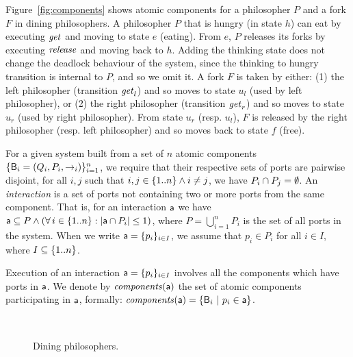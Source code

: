 Figure~\ref{fig:components} shows atomic components for a philosopher $P$
and a fork $F$ in dining philosophers.
%
A philosopher $P$ that is hungry (in state $h$) can eat by
executing $\mathit{get}$ and moving to state $e$ (eating). From $e$, $P$
releases its forks by executing $\mathit{release}$ and moving back to $h$.
%
Adding the thinking state does not change the deadlock behaviour of the system, since the
thinking to hungry transition is internal to $P$, and so we omit it.
%
A fork $F$ is taken by either: (1) the left philosopher 
(transition $\mathit{get}_l$) and so moves to state $u_l$ (used by left
philosopher), or (2) the right philosopher  (transition
$\mathit{get}_r$) and so moves to state $u_r$ (used by right
philosopher). From state $u_r$ (resp. $u_l$), $F$ is released by the
right philosopher (resp. left philosopher) and so moves back to
state $f$ (free).


\begin{definition}[Interaction] For a given system built from a set of $n$ atomic components 
$\{\mathsf{B}_i = (Q_i, P_i, \stackrel{}{\rightarrow}_i)\}_{i=1}^n$, we require that their respective sets of ports are
pairwise disjoint,
\ie for all $i, j$ such that $i, j \in \{ 1..n \} \land i \ne j$, we have $P_i \cap P_j = \emptyset$.
An {\em interaction} is a set of ports not containing two or more ports from the same component.
That is, for an interaction $\mathsf{a}$ we have 
$\mathsf{a} \subseteq P \land (\forall\, i \in \{ 1..n \}: |\mathsf{a} \cap P_i| \le 1)$, where 
$P = \bigcup_{i=1}^n P_i$ is the set of all ports in the
system. When we write $\mathsf{a} = \{p_i\}_{i \in I}$, we assume that
$p_i \in P_i$ for all $i \in I$, where $I \subseteq \{ 1..n \}$.
\end{definition}

\noindent
Execution of an interaction
$\mathsf{a} = \{p_i\}_{i \in I}$
involves all the components which have
ports in $\mathsf{a}$.  
We denote by $\mathit{components}(\mathsf{a})$ the
set of atomic components participating in $\mathsf{a}$, formally:
$\mathit{components}(\mathsf{a}) = \{\mathsf{B}_i ~|~ p_i \in \mathsf{a}\}$. 


\begin{figure}[t]
  \begin{center}
    \mbox{
       \quad
      }
    \caption{Dining philosophers.}
    \label{fig:diningSpectrum}
  \end{center}
\end{figure}






